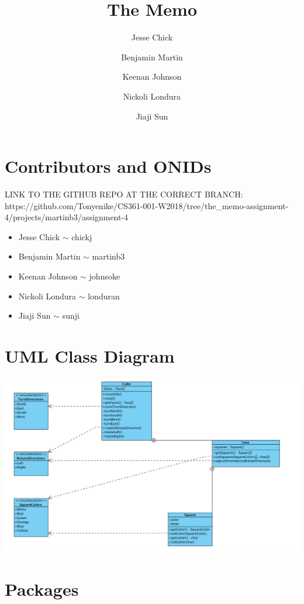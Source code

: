 \documentclass[12pt]{article}
\title{The Memo}
\author{Jesse Chick\\
\and Benjamin Martin\\
\and Keenan Johnson\\
\and Nickoli Londura\\
\and Jiaji Sun}
\begin{document}
\maketitle
\tableofcontents

\section{Contributors and ONIDs}
\par
LINK TO THE GITHUB REPO AT THE CORRECT BRANCH: https://github.com/Tonyenike/CS361-001-W2018/tree/the_memo-assignment-4/projects/martinb3/assignment-4

\begin{itemize}
	\item Jesse Chick $\sim$ chickj
	\item Benjamin Martin $\sim$ martinb3
	\item Keenan Johnson $\sim$ johnsoke
	\item Nickoli Londura $\sim$ londuran
	\item Jiaji Sun $\sim$ sunji
\end{itemize}

\section{UML Class Diagram}
	
	\includegraphics[width = \textwidth]{diagram.PNG}

\section{Packages}
\end{document}
